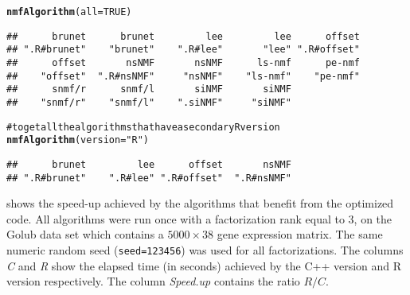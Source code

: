 \documentclass[a4paper]{article}\usepackage{graphicx, color}
\makeatletter
\newcommand{\hlfunctioncall}[1]{\textcolor[rgb]{0.501960784313725,0,0.329411764705882}{\textbf{#1}}}%
\newcommand{\hlstring}[1]{\textcolor[rgb]{0.6,0.6,1}{#1}}%
\newcommand{\hlcomment}[1]{\textcolor[rgb]{0.180392156862745,0.6,0.341176470588235}{#1}}%
\newenvironment{kframe}{%
 \def\at@end@of@kframe{}%
 \ifinner\ifhmode%
  \def\at@end@of@kframe{\end{minipage}}%
  \begin{minipage}{\columnwidth}%
 \fi\fi%
 \def\FrameCommand##1{\hskip\@totalleftmargin \hskip-\fboxsep
 \colorbox{shadecolor}{##1}\hskip-\fboxsep
     \hskip-\linewidth \hskip-\@totalleftmargin \hskip\columnwidth}%
 \MakeFramed {\advance\hsize-\width
   \@totalleftmargin\z@ \linewidth\hsize
   \@setminipage}}%
 {\par\unskip\endMakeFramed%
 \at@end@of@kframe}
\newenvironment{knitrout}{}{} %
\let\code=\texttt
\makeatother
\begin{document}
\begin{knitrout}
\color{fgcolor}\begin{kframe}
\begin{alltt}
\hlfunctioncall{nmfAlgorithm}(all = TRUE)
\end{alltt}
\begin{verbatim}
##      brunet      brunet         lee         lee      offset 
## ".R#brunet"    "brunet"    ".R#lee"       "lee" ".R#offset" 
##      offset       nsNMF       nsNMF      ls-nmf      pe-nmf 
##    "offset"  ".R#nsNMF"     "nsNMF"    "ls-nmf"    "pe-nmf" 
##      snmf/r      snmf/l       siNMF       siNMF 
##    "snmf/r"    "snmf/l"    ".siNMF"     "siNMF"
\end{verbatim}
\begin{alltt}

\hlcomment{# to get all the algorithms that have a secondary R version}
\hlfunctioncall{nmfAlgorithm}(version = \hlstring{"R"})
\end{alltt}
\begin{verbatim}
##      brunet         lee      offset       nsNMF 
## ".R#brunet"    ".R#lee" ".R#offset"  ".R#nsNMF"
\end{verbatim}
\end{kframe}
\end{knitrout}


 shows the speed-up achieved by the algorithms that benefit from the optimized code.
All algorithms were run once with a factorization rank equal to 3, on the Golub data set which contains a $5000\times 38$ gene expression matrix. 
The same numeric random seed (\code{seed=123456}) was used for all factorizations.
The columns \emph{C} and \emph{R} show the elapsed time (in seconds) achieved by the C++ version and R version respectively.
The column \emph{Speed.up} contains the ratio $R/C$. 
\end{document}
